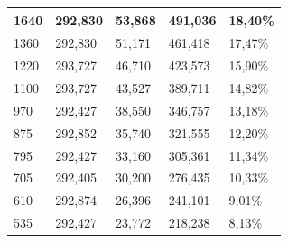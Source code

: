 \begin{table}[H]
\begin{tabular}{|l|l|l|l|l|}
      \rowcolor[HTML]{A9D08E} 
      1640                                & 292,830      & 53,868        & 491,036     & \cellcolor[HTML]{BDD7EE}18,40\%      \\ \hline
      \rowcolor[HTML]{E2EFDA} 
      1360                                & 292,830      & 51,171        & 461,418     & \cellcolor[HTML]{DDEBF7}17,47\%      \\ \hline
      \rowcolor[HTML]{A9D08E} 
      1220                                & 293,727      & 46,710        & 423,573     & \cellcolor[HTML]{BDD7EE}15,90\%      \\ \hline
      \rowcolor[HTML]{E2EFDA} 
      1100                                & 293,727      & 43,527        & 389,711     & \cellcolor[HTML]{DDEBF7}14,82\%      \\ \hline
      \rowcolor[HTML]{A9D08E} 
      970                                 & 292,427      & 38,550        & 346,757     & \cellcolor[HTML]{BDD7EE}13,18\%      \\ \hline
      \rowcolor[HTML]{E2EFDA} 
      875                                 & 292,852      & 35,740        & 321,555     & \cellcolor[HTML]{DDEBF7}12,20\%      \\ \hline
      \rowcolor[HTML]{A9D08E} 
      795                                 & 292,427      & 33,160        & 305,361     & \cellcolor[HTML]{BDD7EE}11,34\%      \\ \hline
      \rowcolor[HTML]{E2EFDA} 
      705                                 & 292,405      & 30,200        & 276,435     & \cellcolor[HTML]{DDEBF7}10,33\%      \\ \hline
      \rowcolor[HTML]{A9D08E} 
      610                                 & 292,874      & 26,396        & 241,101     & \cellcolor[HTML]{BDD7EE}9,01\%       \\ \hline
      \rowcolor[HTML]{E2EFDA} 
      535                                 & 292,427      & 23,772        & 218,238     & \cellcolor[HTML]{DDEBF7}8,13\%       \\ \hline
  \end{tabular}
  \label{tab:230514_Arbeitspunkte}
\end{table}

